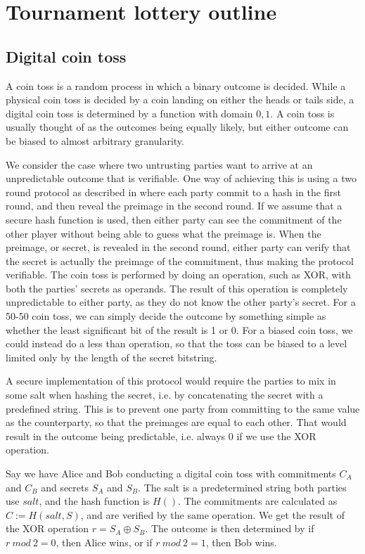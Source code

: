 \section{Tournament lottery outline}
\label{sec:outline}

\subsection{Digital coin toss}

A coin toss is a random process in which a binary outcome is decided. While a physical coin toss is decided by a coin landing on either the heads or tails side, a digital coin toss is determined by a function with domain ${0, 1}$. A coin toss is usually thought of as the outcomes being equally likely, but either outcome can be biased to almost arbitrary granularity.

We consider the case where two untrusting parties want to arrive at an unpredictable outcome that is verifiable. One way of achieving this is using a two round protocol as described in \cite{blum1983coin} where each party commit to a hash in the first round, and then reveal the preimage in the second round. If we assume that a secure hash function is used, then either party can see the commitment of the other player without being able to guess what the preimage is. When the preimage, or secret, is revealed in the second round, either party can verify that the secret is actually the preimage of the commitment, thus making the protocol verifiable. The coin toss is performed by doing an operation, such as XOR, with both the parties' secrets as operands. The result of this operation is completely unpredictable to either party, as they do not know the other party's secret. For a 50-50 coin toss, we can simply decide the outcome by something simple as whether the least significant bit of the result is 1 or 0. For a biased coin toss, we could instead do a less than operation, so that the toss can be biased to a level limited only by the length of the secret bitstring.

A secure implementation of this protocol would require the parties to mix in some salt when hashing the secret, i.e. by concatenating the secret with a predefined string. This is to prevent one party from committing to the same value as the counterparty, so that the preimages are equal to each other. That would result in the outcome being predictable, i.e. always 0 if we use the XOR operation. 

Say we have Alice and Bob conducting a digital coin toss with commitments $C_A$ and $C_B$ and secrets $S_A$ and $S_B$. The salt is a predetermined string both parties use $salt$, and the hash function is $H()$. The commitments are calculated as $C:=H(salt, S)$, and are verified by the same operation. We get the result of the XOR operation $r=S_A \oplus S_B$. The outcome is then determined by if $r\ mod\ 2 = 0$, then Alice wins, or if $r\ mod\ 2 = 1$, then Bob wins.

